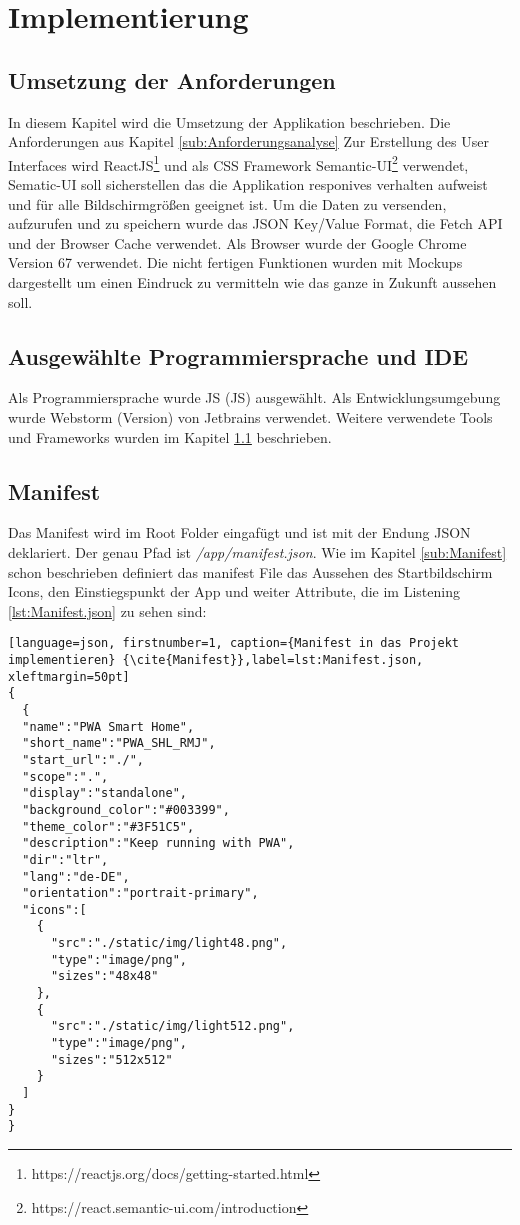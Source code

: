 \chapter{Implementierung}\label{chap:Implementierung}
\thispagestyle{standard}
\pagestyle{standard}

\section{Umsetzung der Anforderungen}\label{sub:Umsetzung der Anforderungen}
In diesem Kapitel wird die Umsetzung der Applikation beschrieben. Die Anforderungen aus Kapitel \ref{sub:Anforderungsanalyse}
Zur Erstellung des User Interfaces wird ReactJS\footnote{https://reactjs.org/docs/getting-started.html} und als CSS Framework Semantic-UI\footnote{https://react.semantic-ui.com/introduction} verwendet, Sematic-UI soll sicherstellen das die Applikation responives verhalten aufweist und für alle Bildschirmgrößen geeignet ist. Um die Daten zu versenden, aufzurufen und zu speichern wurde das JSON Key/Value Format, die Fetch API und der Browser Cache verwendet.
Als Browser wurde der Google Chrome Version 67 verwendet.
Die nicht fertigen Funktionen wurden mit Mockups dargestellt um einen Eindruck zu vermitteln wie das ganze in Zukunft aussehen soll.

\section{Ausgewählte Programmiersprache und IDE}
Als Programmiersprache wurde \acl{JS} (\acs{JS}) ausgewählt. 
Als Entwicklungsumgebung wurde Webstorm (Version) von Jetbrains verwendet. 
Weitere verwendete Tools und Frameworks wurden im Kapitel \ref{sub:Umsetzung der Anforderungen} beschrieben.


\section{Manifest}
Das Manifest wird im Root Folder eingafügt und ist mit der Endung JSON deklariert. Der genau Pfad ist \textit{/app/manifest.json}. Wie im Kapitel \ref{sub:Manifest} schon beschrieben definiert das manifest File das Aussehen des Startbildschirm Icons, den Einstiegspunkt der App und weiter Attribute, die im Listening \ref{lst:Manifest.json} zu sehen sind:

\begin{lstlisting}[language=json, firstnumber=1, caption={Manifest in das Projekt implementieren} {\cite{Manifest}},label=lst:Manifest.json, xleftmargin=50pt]
{
  {
  "name":"PWA Smart Home",
  "short_name":"PWA_SHL_RMJ",
  "start_url":"./",
  "scope":".",
  "display":"standalone",
  "background_color":"#003399",
  "theme_color":"#3F51C5",
  "description":"Keep running with PWA",
  "dir":"ltr",
  "lang":"de-DE",
  "orientation":"portrait-primary",
  "icons":[
    {
      "src":"./static/img/light48.png",
      "type":"image/png",
      "sizes":"48x48"
    },
    {
      "src":"./static/img/light512.png",
      "type":"image/png",
      "sizes":"512x512"
    }
  ]
}
}
\end{lstlisting}


